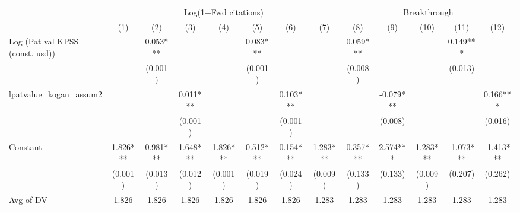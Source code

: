 {
\def\sym#1{\ifmmode^{#1}\else\(^{#1}\)\fi}
\begin{tabular}{l*{12}{c}}
\hline\hline
                    &\multicolumn{7}{c}{Log(1+Fwd citations)}                                                                       &\multicolumn{5}{c}{Breakthrough}                                               \\\cmidrule(lr){2-8}\cmidrule(lr){9-13}
                    &\multicolumn{1}{c}{(1)}   &\multicolumn{1}{c}{(2)}   &\multicolumn{1}{c}{(3)}   &\multicolumn{1}{c}{(4)}   &\multicolumn{1}{c}{(5)}   &\multicolumn{1}{c}{(6)}   &\multicolumn{1}{c}{(7)}   &\multicolumn{1}{c}{(8)}   &\multicolumn{1}{c}{(9)}   &\multicolumn{1}{c}{(10)}   &\multicolumn{1}{c}{(11)}   &\multicolumn{1}{c}{(12)}   \\
\hline
Log (Pat val KPSS (const. usd))&               &       0.053***&               &               &       0.083***&               &               &       0.059***&               &               &       0.149***&               \\
                    &               &     (0.001)   &               &               &     (0.001)   &               &               &     (0.008)   &               &               &     (0.013)   &               \\
lpatvalue\_kogan\_assum2&               &               &       0.011***&               &               &       0.103***&               &               &      -0.079***&               &               &       0.166***\\
                    &               &               &     (0.001)   &               &               &     (0.001)   &               &               &     (0.008)   &               &               &     (0.016)   \\
Constant            &       1.826***&       0.981***&       1.648***&       1.826***&       0.512***&       0.154***&       1.283***&       0.357***&       2.574***&       1.283***&      -1.073***&      -1.413***\\
                    &     (0.001)   &     (0.013)   &     (0.012)   &     (0.001)   &     (0.019)   &     (0.024)   &     (0.009)   &     (0.133)   &     (0.133)   &     (0.009)   &     (0.207)   &     (0.262)   \\
\hline
Avg of DV           &       1.826   &       1.826   &       1.826   &       1.826   &       1.826   &       1.826   &       1.283   &       1.283   &       1.283   &       1.283   &       1.283   &       1.283   \\

\end{tabular}}
